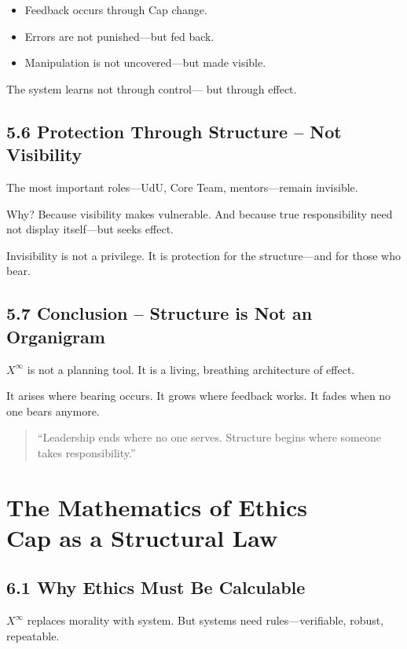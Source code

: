 \documentclass[12pt,a4paper]{book}
\begin{document}
\begin{itemize}
    \item Feedback occurs through Cap change.
    \item Errors are not punished—but fed back.
    \item Manipulation is not uncovered—but made visible.
\end{itemize}

The system learns not through control—  
but through effect.

\section*{5.6 Protection Through Structure – Not Visibility}

The most important roles—UdU, Core Team, mentors—remain invisible.

Why?  
Because visibility makes vulnerable.  
And because true responsibility need not display itself—but seeks effect.

Invisibility is not a privilege.  
It is protection for the structure—and for those who bear.

\section*{5.7 Conclusion – Structure is Not an Organigram}

$X^\infty$ is not a planning tool.  
It is a living, breathing architecture of effect.

It arises where bearing occurs.  
It grows where feedback works.  
It fades when no one bears anymore.

\begin{quote}
“Leadership ends where no one serves.  
Structure begins where someone takes responsibility.”  
\end{quote}

\chapter{The Mathematics of Ethics\\Cap as a Structural Law}

\section*{6.1 Why Ethics Must Be Calculable}

$X^\infty$ replaces morality with system.  
But systems need rules—verifiable, robust, repeatable.
\end{document}
